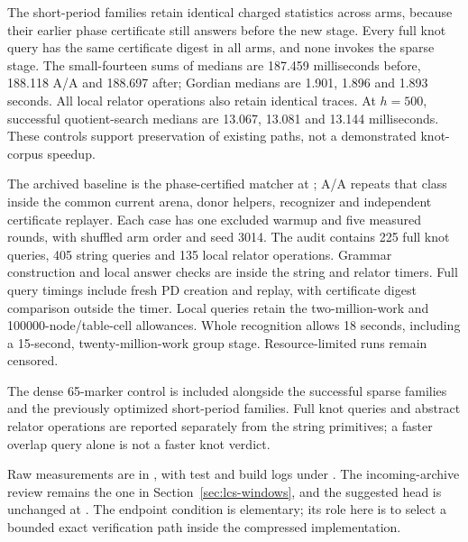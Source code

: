 The short-period families retain identical charged statistics across arms,
because their earlier phase certificate still answers before the new stage.
Every full knot query has the same certificate digest in all arms, and
none invokes the sparse stage. The small-fourteen sums of medians are
187.459 milliseconds before, 188.118 A/A and 188.697 after; Gordian medians
are 1.901, 1.896 and 1.893 seconds. All local relator operations also retain
identical traces. At $h=500$, successful quotient-search medians are
13.067, 13.081 and 13.144 milliseconds. These controls support preservation
of existing paths, not a demonstrated knot-corpus speedup.

The archived baseline is the phase-certified matcher at ;
A/A repeats that class inside the common current arena, donor helpers,
recognizer and independent certificate replayer. Each case has one excluded
warmup and five measured rounds, with shuffled arm order and seed 3014.
The audit contains 225 full knot queries, 405 string queries and 135 local
relator operations. Grammar construction and local answer checks are inside
the string and relator timers. Full query timings include fresh PD creation
and replay, with certificate digest comparison outside the timer.
Local queries retain the two-million-work and 100000-node/table-cell
allowances. Whole recognition allows 18 seconds, including a 15-second,
twenty-million-work group stage. Resource-limited runs remain censored.

The dense 65-marker control is included alongside the successful sparse
families and the previously optimized short-period families. Full knot
queries and abstract relator operations are reported separately from the
string primitives; a faster overlap query alone is not a faster knot verdict.

Raw measurements are in , with
test and build logs under .
The incoming-archive review remains the one in
Section~\ref{sec:lcs-windows}, and the suggested  head
is unchanged at . The endpoint condition is elementary;
its role here is to select a bounded exact verification path inside the
compressed implementation.
